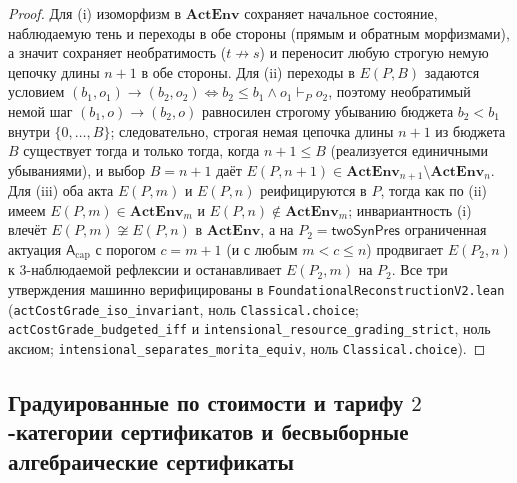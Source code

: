\documentclass[11pt]{article}
\theoremstyle{plain}
\theoremstyle{definition}
\begin{document}
\begin{proof}
Для (i) изоморфизм в $\mathbf{ActEnv}$ сохраняет начальное состояние, наблюдаемую тень и переходы в обе стороны (прямым и обратным морфизмами), а значит сохраняет необратимость ($t \not\to s$) и переносит любую строгую немую цепочку длины $n+1$ в обе стороны. Для (ii) переходы в $E(P, B)$ задаются условием $(b_1, o_1) \to (b_2, o_2) \iff b_2 \le b_1 \wedge o_1 \vdash_P o_2$, поэтому необратимый немой шаг $(b_1, o) \to (b_2, o)$ равносилен строгому убыванию бюджета $b_2 < b_1$ внутри $\{0,\dots,B\}$; следовательно, строгая немая цепочка длины $n+1$ из бюджета $B$ существует тогда и только тогда, когда $n + 1 \le B$ (реализуется единичными убываниями), и выбор $B = n + 1$ даёт $E(P, n+1) \in \mathbf{ActEnv}_{n+1} \setminus \mathbf{ActEnv}_n$. Для (iii) оба акта $E(P, m)$ и $E(P, n)$ реифицируются в $P$, тогда как по (ii) имеем $E(P, m) \in \mathbf{ActEnv}_m$ и $E(P, n) \notin \mathbf{ActEnv}_m$; инвариантность (i) влечёт $E(P, m) \not\cong E(P, n)$ в $\mathbf{ActEnv}$, а на $P_2 = \mathsf{twoSynPres}$ ограниченная актуация $\mathsf{A}_{\mathrm{cap}}$ с порогом $c = m + 1$ (и с любым $m < c \le n$) продвигает $E(P_2, n)$ к $3$-наблюдаемой рефлексии и останавливает $E(P_2, m)$ на $P_2$. Все три утверждения машинно верифицированы в \texttt{FoundationalReconstructionV2.lean} (\texttt{actCostGrade\_\allowbreak iso\_\allowbreak invariant}, ноль \texttt{Classical.choice}; \texttt{actCostGrade\_\allowbreak budgeted\_\allowbreak iff} и \texttt{intensional\_\allowbreak resource\_\allowbreak grading\_\allowbreak strict}, ноль аксиом; \texttt{intensional\_\allowbreak separates\_\allowbreak morita\_\allowbreak equiv}, ноль \texttt{Classical.choice}).
\end{proof}

\subsection{Градуированные по стоимости и тарифу \texorpdfstring{$2$-категории}{2-категории} сертификатов и бесвыборные алгебраические сертификаты}\label{sec:cert-2cat-adequacy}
\end{document}

